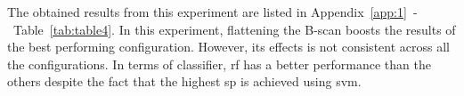 The obtained results from this experiment are listed in Appendix~\ref{app:1}~-~Table~\ref{tab:table4}.
In this experiment, flattening the B-scan boosts the results of the best performing configuration.
However, its effects is not consistent across all the configurations.
In terms of classifier, \ac{rf} has a better performance than the others despite the fact that the highest \ac{sp} is achieved using \ac{svm}.





%
%




